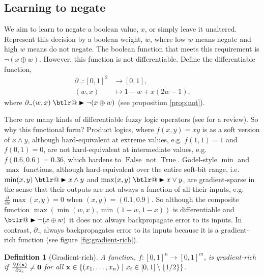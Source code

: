\documentclass{article} %
\makeatletter
\newtheorem*{definition}{Definition}
\DeclareRobustCommand{\btright}{\mathrel{\mathpalette\btlr@\blacktriangleright}}
\newcommand{\btlr@}[2]{%
	\begingroup
	\sbox\z@{$\m@th#1\triangleright$}%
	\sbox\tw@{\resizebox{1.1\wd\z@}{1.1\ht\z@}{\raisebox{\depth}{$\m@th#1\mkern-1mu#2$}}}%
	\ht\tw@=\ht\z@ \dp\tw@=\dp\z@ \wd\tw@=\wd\z@
	\copy\tw@
	\endgroup
}
\makeatother
\begin{document}
\subsection{Learning to negate}

We aim to learn to negate a boolean value, $x$, or simply leave it unaltered. Represent this decision by a boolean weight, $w$, where low $w$ means negate and high $w$ means do not negate. The boolean function that meets this requirement is $\neg(x \oplus w)$. However, this function is not differentiable. Define the differentiable function,
	\begin{equation*}
	\begin{aligned}
	\partial_{\neg}: [0, 1]^{2} &\to [0,1], \\
	(w, x) &\mapsto 1 - w + x (2w - 1)\text{,}
	\end{aligned}
	\end{equation*}
where $\partial_{\neg}(w, x) \btright \neg(x \oplus w)$ (see proposition \ref{prop:not}).

There are many kinds of differentiable fuzzy logic operators (see \cite{VANKRIEKEN2022103602} for a review). So why this functional form? Product logics, where $f(x,y) = x y$ is as a soft version of $x \wedge y$, although hard-equivalent at extreme values, e.g. $f(1,1)=1$ and $f(0,1)=0$, are not hard-equivalent at intermediate values, e.g. $f(0.6, 0.6) = 0.36$, which hardens to $\operatorname{False}$ not $\operatorname{True}$. G\"{o}del-style $\operatorname{min}$ and $\operatorname{max}$ functions, although hard-equivalent over the entire soft-bit range, i.e. $\operatorname{min}(x,y) \btright x \wedge y$ and $\operatorname{max}(x,y) \btright x \vee y$, are gradient-sparse in the sense that their outputs are not always a function of all their inputs, e.g. $\frac{\partial}{\partial x} \operatorname{max}(x,y) = 0$ when $(x,y)=(0.1, 0.9)$. So although the composite function $\operatorname{max}(\operatorname{min}(w, x), \operatorname{min}(1-w, 1-x))$ is differentiable and $\btright \neg(x \oplus w)$ it does not always backpropagate error to its inputs. In contrast, $\partial_{\neg}$ always backpropagates error to its inputs because it is a gradient-rich function (see figure \ref{fig:gradient-rich}). 

\begin{definition}[Gradient-rich]
	A function, $f: [0,1]^n \rightarrow [0,1]^m$, is {\em gradient-rich} if $\frac{\partial f({\bf x})}{\partial x_{i}} \neq {\bf 0}$ for all ${\bf x} \in \{(x_{1}, \dots, x_{n}) ~|~ x_{i} \in [0,1] \setminus \{1/2\}\}$.
\end{definition}
\end{document}
